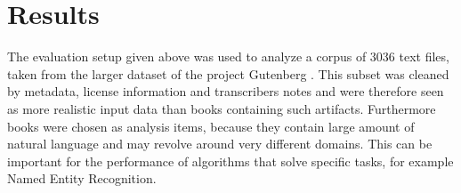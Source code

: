 \section{Results}
The evaluation setup given above was used to analyze a corpus of 3036 text files, taken from the larger dataset of the project Gutenberg \cite{lahiri:2014:SRW}. This subset was cleaned by metadata, license information and transcribers notes and were therefore seen as more realistic input data than books containing such artifacts. Furthermore books were chosen as analysis items, because they contain large amount of natural language and may revolve around very different domains. This can be important for the performance of algorithms that solve specific \nlp{} tasks, for example Named Entity Recognition.

